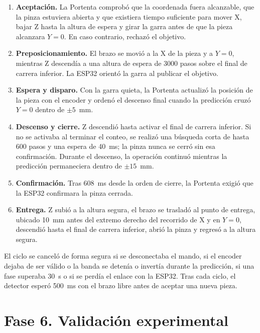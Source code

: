 \begin{enumerate}
	\item \textbf{Aceptación.} La Portenta comprobó que la coordenada fuera alcanzable, que la pinza estuviera abierta y que existiera tiempo suficiente para mover X, bajar Z hasta la altura de espera y girar la garra antes de que la pieza alcanzara $Y=0$. En caso contrario, rechazó el objetivo.
	\item \textbf{Preposicionamiento.} El brazo se movió a la X de la pieza y a $Y=0$, mientras Z descendía a una altura de espera de 3000 pasos sobre el final de carrera inferior. La ESP32 orientó la garra al publicar el objetivo.
	\item \textbf{Espera y disparo.} Con la garra quieta, la Portenta actualizó la posición de la pieza con el encoder y ordenó el descenso final cuando la predicción cruzó $Y=0$ dentro de $\pm5$~mm.
	\item \textbf{Descenso y cierre.} Z descendió hasta activar el final de carrera inferior. Si no se activaba al terminar el conteo, se realizó una búsqueda corta de hasta 600 pasos y una espera de 40~ms; la pinza nunca se cerró sin esa confirmación. Durante el descenso, la operación continuó mientras la predicción permaneciera dentro de $\pm15$~mm.
	\item \textbf{Confirmación.} Tras 608~ms desde la orden de cierre, la Portenta exigió que la ESP32 confirmara la pinza cerrada.
	\item \textbf{Entrega.} Z subió a la altura segura, el brazo se trasladó al punto de entrega, ubicado 10~mm antes del extremo derecho del recorrido de X y en $Y=0$, descendió hasta el final de carrera inferior, abrió la pinza y regresó a la altura segura.
\end{enumerate}

El ciclo se canceló de forma segura si se desconectaba el mando, si el encoder dejaba de ser válido o la banda se detenía o invertía durante la predicción, si una fase superaba 30~s o si se perdía el enlace con la ESP32. Tras cada ciclo, el detector esperó 500~ms con el brazo libre antes de aceptar una nueva pieza.



\section{Fase 6. Validación experimental}
\label{sec:metodologia_fase6}

